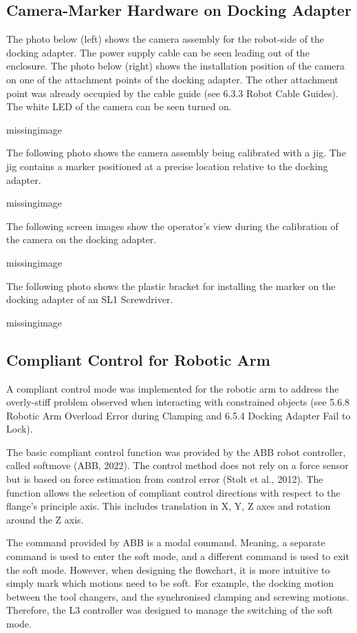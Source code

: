 \subsection{Camera-Marker Hardware on Docking Adapter}
The photo below (left) shows the camera assembly for the robot-side of the docking adapter. The power supply cable can be seen leading out of the enclosure. The photo below (right) shows the installation position of the camera on one of the attachment points of the docking adapter. The other attachment point was already occupied by the cable guide (see 6.3.3 Robot Cable Guides). The white LED of the camera can be seen turned on.

missingimage

The following photo shows the camera assembly being calibrated with a jig. The jig contains a marker positioned at a precise location relative to the docking adapter.

missingimage

The following screen images show the operator’s view during the calibration of the camera on the docking adapter.

missingimage

The following photo shows the plastic bracket for installing the marker on the docking adapter of an SL1 Screwdriver. 

missingimage

\subsection{Compliant Control for Robotic Arm}
A compliant control mode was implemented for the robotic arm to address the overly-stiff problem observed when interacting with constrained objects (see 5.6.8 Robotic Arm Overload Error during Clamping and 6.5.4 Docking Adapter Fail to Lock).

The basic compliant control function was provided by the ABB robot controller, called softmove (ABB, 2022). The control method does not rely on a force sensor but is based on force estimation from control error (Stolt et al., 2012). The function allows the selection of compliant control directions with respect to the flange’s principle axis. This includes translation in X, Y, Z axes and rotation around the Z axis. 

The command provided by ABB is a modal command. Meaning, a separate command is used to enter the soft mode, and a different command is used to exit the soft mode. However, when designing the flowchart, it is more intuitive to simply mark which motions need to be soft. For example, the docking motion between the tool changers, and the synchronised clamping and screwing motions. Therefore, the L3 controller was designed to manage the switching of the soft mode. 

